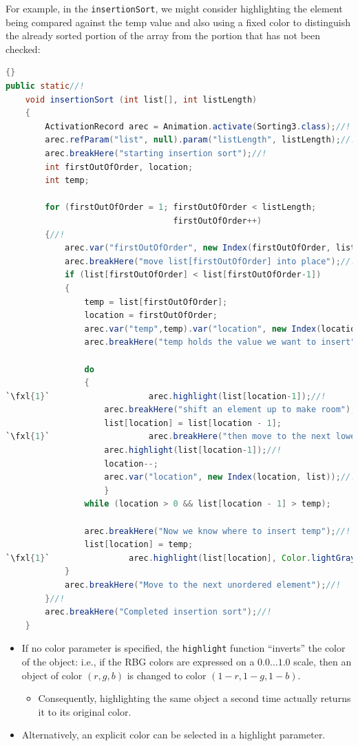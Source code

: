 \documentclass[11pt,titlepage]{book}
\def\fxl#1{%
\newdimen\fxlheight\setlength{\fxlheight}{#1\baselineskip}%
\advance\fxlheight by -0.5\baselineskip%
\begin{picture}(0,0)%
\setlength{\unitlength}{\baselineskip}%
\put(0,0){\makebox(0,0.75)[tl]{%
\colorbox{paleyellow}{%
\rule{0pt}{\fxlheight}%
\rule{\linewidth}{0pt}}%
}}\end{picture}%
}
\begin{document}
For example, in the {\tt insertionSort}, we might consider
highlighting the element being compared against the temp value and
also using a fixed color to distinguish the already sorted portion of
the array from the portion that has not been checked:
\begin{lstlisting}[language=Java,frame=tb]{}
public static//!
    void insertionSort (int list[], int listLength)
    {
        ActivationRecord arec = Animation.activate(Sorting3.class);//!
        arec.refParam("list", null).param("listLength", listLength);//!
        arec.breakHere("starting insertion sort");//!
        int firstOutOfOrder, location;
        int temp;
        
        for (firstOutOfOrder = 1; firstOutOfOrder < listLength;
                                  firstOutOfOrder++)
        {//!
            arec.var("firstOutOfOrder", new Index(firstOutOfOrder, list));//!
            arec.breakHere("move list[firstOutOfOrder] into place");//!
            if (list[firstOutOfOrder] < list[firstOutOfOrder-1])
            {
                temp = list[firstOutOfOrder];
                location = firstOutOfOrder;
                arec.var("temp",temp).var("location", new Index(location, list));//!
                arec.breakHere("temp holds the value we want to insert");//!
                
                do
                {
`\fxl{1}`                    arec.highlight(list[location-1]);//!
                    arec.breakHere("shift an element up to make room");//!
                    list[location] = list[location - 1];
`\fxl{1}`                    arec.breakHere("then move to the next lower element");//!
                    arec.highlight(list[location-1]);//!
                    location--;
                    arec.var("location", new Index(location, list));//!
                    }
                while (location > 0 && list[location - 1] > temp);
                
                arec.breakHere("Now we know where to insert temp");//!
                list[location] = temp;
`\fxl{1}`                arec.highlight(list[location], Color.lightGray);//!
            }
            arec.breakHere("Move to the next unordered element");//!
        }//!
        arec.breakHere("Completed insertion sort");//!
    }
\end{lstlisting}
\begin{itemize}
\item If no color parameter is specified, the \texttt{highlight}
  function ``inverts'' the color of the object: i.e., if the RBG
  colors are expressed on a $0.0\ldots 1.0$ scale, then an object of
  color $(r,g,b)$ is changed to color $(1-r,1-g,1-b)$.
  \begin{itemize}
  \item Consequently, highlighting the same object a second 
    time actually returns it to its original color.
  \end{itemize}
\item Alternatively, an explicit color can be selected 
  in a highlight parameter.
\end{itemize}
\end{document}
